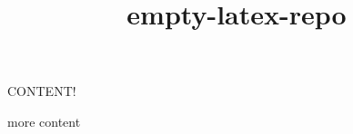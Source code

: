 \documentclass[11pt]{article}
\title{empty-latex-repo}
\begin{document}
\maketitle

CONTENT!

\citet{ebert_computationally_2017} more content \citet{BNEreport}


\end{document}
